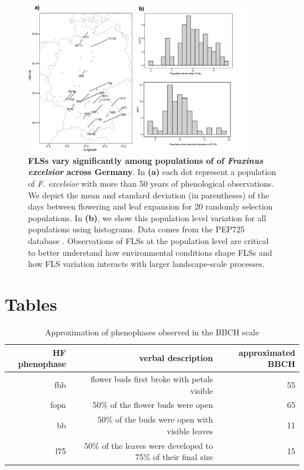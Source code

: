 \documentclass[11pt]{article}
\begin{document}
\begin{figure}[H]
\centering
\includegraphics[width=0.9\textwidth]{..//..//popmap.png} 
  \caption{\textbf{FLSs vary significantly among populations of of \emph{Fraxinus excelsior} across Germany}. In \textbf{(a)} each dot represent a population of \emph{F. excelsior} with more than 50 years of phenological observations. We depict the mean and standard deviation (in parentheses) of the days between flowering and leaf expansion for 20 randomly selection populations. In \textbf{(b)}, we show this population level variation for all populations using histograms. Data comes from the PEP725 database \citep{PEP725}. Observations of FLSs at the population level are critical to better understand how environmental conditions shape FLSs and how FLS variation interacts with larger landscape-scale processes.}
  \label{fig:popmap}
    \end{figure}
    
\pagebreak[4]

\section*{Tables}

\begin{table}[H]
\centering
\begin{tabular}{rrr}
  \hline
  HF phenophase & verbal description & approximated BBCH  \\ 
  \hline
  fbb & flower buds first broke with petals visible & 55 \\
  fopn &  50\% of the flower buds were open & 65 \\
 bb &  50\% of the buds were open with visible leaves & 11 \\
 l75 & 50\% of the leaves were developed to 75\% of their final size &  15 \\
   \hline
\end{tabular}
\caption{Approximation of phenophases observed in \citep{OKeefe2015} the BBCH scale \citep{Finn2007}} 
\label{tab:BBCH2HF}
\end{table}
\end{document}
